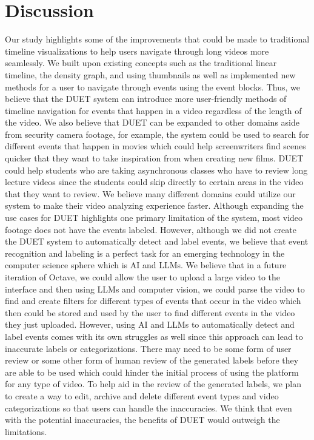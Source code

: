 \documentclass[doublespace,draft,nopageskip]{VTthesis} %
\begin{document}
	\chapter{Discussion} \label{ch:discussion}
Our study highlights some of the improvements that could be made to traditional timeline visualizations to help users navigate through long videos more seamlessly. We built upon existing concepts such as the traditional linear timeline, the density graph, and using thumbnails as well as implemented new methods for a user to navigate through events using the event blocks. Thus, we believe that the DUET system can introduce more user-friendly methods of timeline navigation for events that happen in a video regardless of the length of the video. We also believe that DUET can be expanded to other domains aside from security camera footage, for example, the system could be used to search for different events that happen in movies which could help screenwriters find scenes quicker that they want to take inspiration from when creating new films. DUET could help students who are taking asynchronous classes who have to review long lecture videos since the students could skip directly to certain areas in the video that they want to review. We believe many different domains could utilize our system to make their video analyzing experience faster.
Although expanding the use cases for DUET highlights one primary limitation of the system, most video footage does not have the events labeled. However, although we did not create the DUET system to automatically detect and label events, we believe that event recognition and labeling is a perfect task for an emerging technology in the computer science sphere which is AI and LLMs. We believe that in a future iteration of Octave, we could allow the user to upload a large video to the interface and then using LLMs and computer vision, we could parse the video to find and create filters for different types of events that occur in the video which then could be stored and used by the user to find different events in the video they just uploaded. However, using AI and LLMs to automatically detect and label events comes with its own struggles as well since this approach can lead to inaccurate labels or categorizations. There may need to be some form of user review or some other form of human review of the generated labels before they are able to be used which could hinder the initial process of using the platform for any type of video. To help aid in the review of the generated labels, we plan to create a way to edit, archive and delete different event types and video categorizations so that users can handle the inaccuracies. We think that even with the potential inaccuracies, the benefits of DUET would outweigh the limitations.
\end{document}
